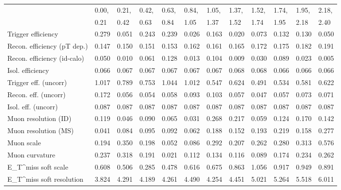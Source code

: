 \begin{tabular}{l|p{0.6cm}p{0.6cm}p{0.6cm}p{0.6cm}p{0.6cm}p{0.6cm}p{0.6cm}p{0.6cm}p{0.6cm}p{0.6cm}p{0.6cm}}
\hline
   & 0.00, & 0.21, & 0.42, & 0.63, & 0.84, & 1.05, & 1.37, & 1.52, & 1.74, & 1.95, & 2.18,  \\ 
   & 0.21 & 0.42 & 0.63 & 0.84 & 1.05 & 1.37 & 1.52 & 1.74 & 1.95 & 2.18 & 2.40  \\ 
\hline
Trigger efficiency                       & 0.279 & 0.051 & 0.243 & 0.239 & 0.026 & 0.163 & 0.020 & 0.073 & 0.132 & 0.130 & 0.050 \\
Recon. efficiency (pT dep.)              & 0.147 & 0.150 & 0.151 & 0.153 & 0.162 & 0.161 & 0.165 & 0.172 & 0.175 & 0.182 & 0.191 \\
Recon. efficiency (id-calo)              & 0.050 & 0.010 & 0.061 & 0.128 & 0.013 & 0.104 & 0.009 & 0.030 & 0.089 & 0.023 & 0.005 \\
Isol. efficiency                         & 0.066 & 0.067 & 0.067 & 0.067 & 0.067 & 0.067 & 0.068 & 0.068 & 0.066 & 0.066 & 0.066 \\
Trigger eff. (uncorr)                    & 1.017 & 0.789 & 0.753 & 1.044 & 1.012 & 0.547 & 0.624 & 0.491 & 0.534 & 0.581 & 0.622 \\
Recon. eff. (uncorr)                     & 0.172 & 0.056 & 0.054 & 0.058 & 0.093 & 0.103 & 0.057 & 0.047 & 0.057 & 0.073 & 0.071 \\
Isol. eff. (uncorr)                      & 0.087 & 0.087 & 0.087 & 0.087 & 0.087 & 0.087 & 0.087 & 0.087 & 0.087 & 0.087 & 0.087 \\
Muon resolution (ID)                     & 0.119 & 0.046 & 0.090 & 0.065 & 0.031 & 0.268 & 0.217 & 0.059 & 0.124 & 0.170 & 0.142 \\
Muon resolution (MS)                     & 0.041 & 0.084 & 0.095 & 0.092 & 0.062 & 0.188 & 0.152 & 0.193 & 0.219 & 0.158 & 0.277 \\
Muon scale                               & 0.194 & 0.350 & 0.198 & 0.052 & 0.086 & 0.292 & 0.207 & 0.262 & 0.280 & 0.313 & 0.576 \\
Muon curvature                           & 0.237 & 0.318 & 0.191 & 0.021 & 0.112 & 0.134 & 0.116 & 0.089 & 0.174 & 0.234 & 0.262 \\
E_{T}^{miss} soft scale                  & 0.608 & 0.506 & 0.285 & 0.478 & 0.616 & 0.675 & 0.863 & 1.056 & 0.917 & 0.949 & 0.891 \\
E_{T}^{miss} soft resolution             & 3.824 & 4.291 & 4.189 & 4.261 & 4.490 & 4.254 & 4.451 & 5.021 & 5.264 & 5.518 & 6.011 \\

\end{tabular}
